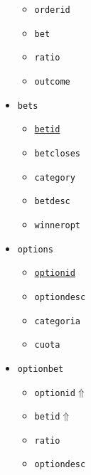 \documentclass{article}
\begin{document}
\begin{multicols}{2}
\begin{itemize}
\begin{itemize}
            \item\texttt{orderid}
            \item\texttt{bet}
            \item\texttt{ratio}
            \item\texttt{outcome}
        \end{itemize}
    \item\texttt{bets}
        \begin{itemize}
            \item\texttt{\underline{betid}}
            \item\texttt{betcloses}
            \item\texttt{category}
            \item\texttt{betdesc}
            \item\texttt{winneropt}
        \end{itemize}
    \item\texttt{options}
        \begin{itemize}
            \item\texttt{\underline{optionid}}
            \item\texttt{optiondesc}
            \item\texttt{categoria}
            \item\texttt{cuota}
        \end{itemize}
    \item\texttt{optionbet}
        \begin{itemize}
            \item\texttt{optionid}$\Uparrow$
            \item\texttt{betid}$\Uparrow$
            \item\texttt{ratio}
            \item\texttt{optiondesc}
        \end{itemize}
\end{itemize}
\end{multicols}
\newpage
\end{document}
